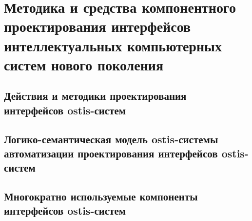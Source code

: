 \chapter{Методика и средства компонентного проектирования интерфейсов интеллектуальных компьютерных систем нового поколения}
\label{chapter_ui_design}


\section{Действия и методики проектирования интерфейсов ostis-систем}
\section{Логико-семантическая модель ostis-системы автоматизации проектирования интерфейсов ostis-систем}
\section{Многократно используемые компоненты интерфейсов ostis-систем}

%